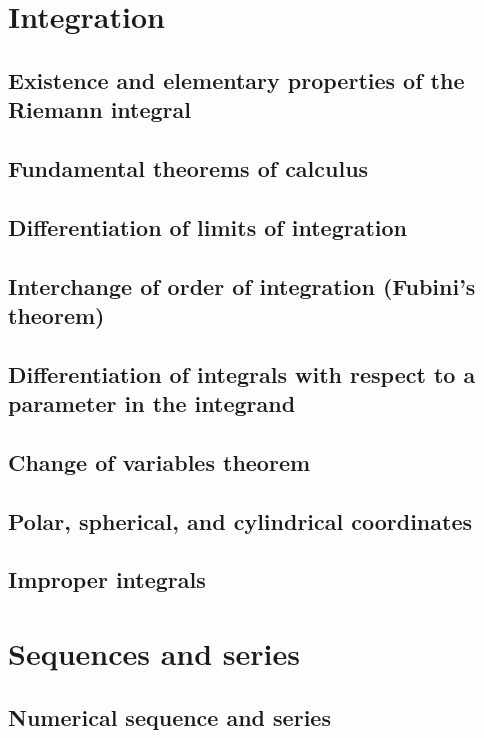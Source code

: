 \documentclass[11pt]{article}
\theoremstyle{definition}
\theoremstyle{plain}
\theoremstyle{remark}
\begin{document}
\section{Integration}

\subsection{Existence and elementary properties of the Riemann integral}

\subsection{Fundamental theorems of calculus}

\subsection{Differentiation of limits of integration}

\subsection{Interchange of order of integration (Fubini’s theorem)}

\subsection{Differentiation of integrals with respect to a parameter in the integrand}

\subsection{Change of variables theorem}

\subsection{Polar, spherical, and cylindrical coordinates}

\subsection{Improper integrals}

\section{Sequences and series}

\subsection{Numerical sequence and series}
\end{document}

